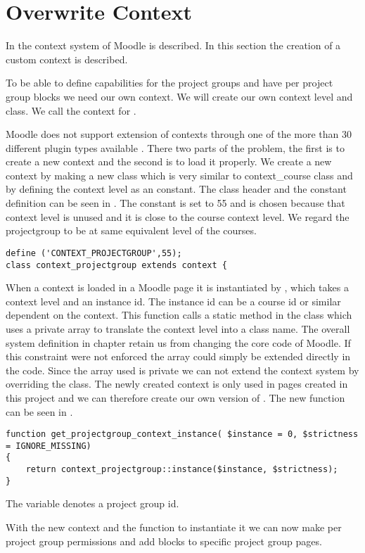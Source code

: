 
\section{Overwrite Context}
In   the context system of Moodle is described. In this section the creation of a custom context is described. 

To be able to define capabilities for the project groups and have per project group blocks we need our own context. We will create our own context level and class.
We call the context for . 

Moodle does not support extension of contexts through one of the more than 30 different plugin types available \cite{moodleplugins}. 
There two parts of the problem, the first is to create a new context and the second is to load it properly. 
We create a new context by making a new class which is very similar to context\_course class and by defining the context level as an constant. 
The class header and the constant definition can be seen in . 
The constant is set to 55 and is chosen because that context level is unused and it is close to the course context level. 
We regard the projectgroup to be at same equivalent level of the courses. 

\begin{lstlisting}[style=phpCode, caption=\myCaption{The context\_projectgroup class header and constant definition}, label=codeprojectgroupcontext]
define ('CONTEXT_PROJECTGROUP',55);
class context_projectgroup extends context {
\end{lstlisting}

When a context is loaded in a Moodle page it is instantiated by , which takes a context level and an instance id. 
The instance id can be a course id or similar dependent on the context. 
This function calls a static method in the  class which uses a private array to translate the context level into a class name.
The overall system definition in chapter \label{sec:systemDef} retain us from changing the core code of Moodle. 
If this constraint were not enforced the array could simply be extended directly in the code.  
Since the array used is private we can not extend the context system by overriding the  class. 
The newly created context is only used in pages created in this project and we can therefore create our own version of . 
The new function can be seen in .
\begin{lstlisting}[style=phpCode, caption=\myCaption{The function to get projectgroup context}, label=codeprojectgroupcontextinstance]
function get_projectgroup_context_instance( $instance = 0, $strictness = IGNORE_MISSING) 
{ 
    return context_projectgroup::instance($instance, $strictness);
}
\end{lstlisting}
The  variable denotes a project group id. 

With the new context and the function to instantiate it we can now make per project group permissions and add blocks to specific project group pages. 